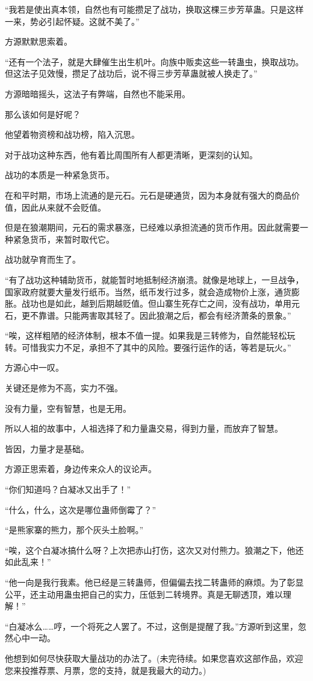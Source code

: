 \begin{this_body}
“我若是使出真本领，自然也有可能攒足了战功，换取这棵三步芳草蛊。只是这样一来，势必引起怀疑。这就不美了。”

方源默默思索着。

“还有一个法子，就是大肆催生出生机叶。向族中贩卖这些一转蛊虫，换取战功。但这法子见效慢，攒足了战功后，说不得三步芳草蛊就被人换走了。”

方源暗暗摇头，这法子有弊端，自然也不能采用。

那么该如何是好呢？

他望着物资榜和战功榜，陷入沉思。

对于战功这种东西，他有着比周围所有人都更清晰，更深刻的认知。

战功的本质是一种紧急货币。

在和平时期，市场上流通的是元石。元石是硬通货，因为本身就有强大的商品价值，因此从来就不会贬值。

但是在狼潮期间，元石的需求暴涨，已经难以承担流通的货币作用。因此就需要一种紧急货币，来暂时取代它。

战功就孕育而生了。

“有了战功这种辅助货币，就能暂时地抵制经济崩溃。就像是地球上，一旦战争，国家政府就要大量发行纸币。当然，纸币发行过多，就会造成物价上涨，通货膨胀。战功也是如此，越到后期越贬值。但山寨生死存亡之间，没有战功，单用元石，更不靠谱。只能两害取其轻了。因此狼潮之后，都会有经济萧条的景象。”

“唉，这样粗陋的经济体制，根本不值一提。如果我是三转修为，自然能轻松玩转。可惜我实力不足，承担不了其中的风险。要强行运作的话，等若是玩火。”

方源心中一叹。

关键还是修为不高，实力不强。

没有力量，空有智慧，也是无用。

所以人祖的故事中，人祖选择了和力量蛊交易，得到力量，而放弃了智慧。

皆因，力量才是基础。

方源正思索着，身边传来众人的议论声。

“你们知道吗？白凝冰又出手了！”

“什么，什么，这次是哪位蛊师倒霉了？”

“是熊家寨的熊力，那个灰头土脸啊。”

“唉，这个白凝冰搞什么呀？上次把赤山打伤，这次又对付熊力。狼潮之下，他还如此乱来！”

“他一向是我行我素。他已经是三转蛊师，但偏偏去找二转蛊师的麻烦。为了彰显公平，还主动用蛊虫把自己的实力，压低到二转境界。真是无聊透顶，难以理解！”

“白凝冰么……哼，一个将死之人罢了。不过，这倒是提醒了我。”方源听到这里，忽然心中一动。

他想到如何尽快获取大量战功的办法了。(未完待续。如果您喜欢这部作品，欢迎您来投推荐票、月票，您的支持，就是我最大的动力。)

\end{this_body}

